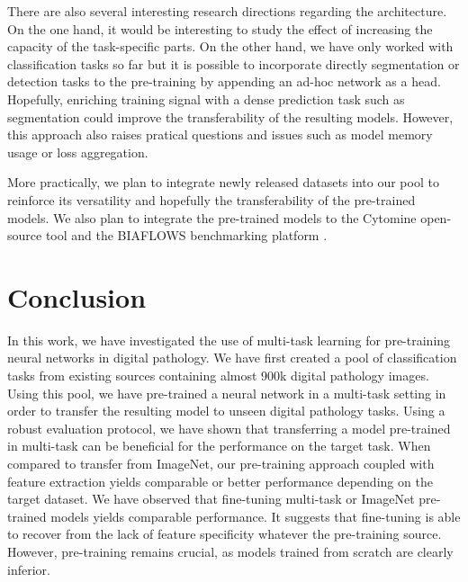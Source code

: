 There are also several interesting research directions regarding the architecture. On the one hand, it would be interesting to study the effect of increasing the capacity of the task-specific parts. On the other hand, we have only worked with classification tasks so far but it is possible to incorporate directly segmentation or detection tasks to the pre-training by appending an ad-hoc network as a head. Hopefully, enriching training signal with a dense prediction task such as segmentation could improve the transferability of the resulting models. However, this approach also raises pratical questions and issues such as model memory usage or loss aggregation. 

More practically, we plan to integrate newly released datasets into our pool to reinforce its versatility and hopefully the transferability of the pre-trained models. We also plan to integrate the pre-trained models %
to the Cytomine open-source tool \parencite{maree2016collaborative} and the BIAFLOWS benchmarking platform \parencite{rubens2020biaflows}.


\section{Conclusion}

In this work, we have investigated the use of multi-task learning for pre-training neural networks in digital pathology. We have first created a pool of classification tasks from existing sources containing almost 900k digital pathology images. Using this pool, we have pre-trained a neural network in a multi-task setting in order to transfer the resulting model to unseen digital pathology tasks. Using a robust evaluation protocol, we have shown that transferring a model pre-trained in multi-task can be beneficial for the performance on the target task. When compared to transfer from ImageNet, our pre-training approach coupled with feature extraction yields comparable or better performance depending on the target dataset. We have observed that fine-tuning multi-task or ImageNet pre-trained models yields comparable performance. It suggests that fine-tuning is able to recover from the lack of feature specificity whatever the pre-training source. However, pre-training remains crucial, as models trained from scratch are clearly inferior. 



